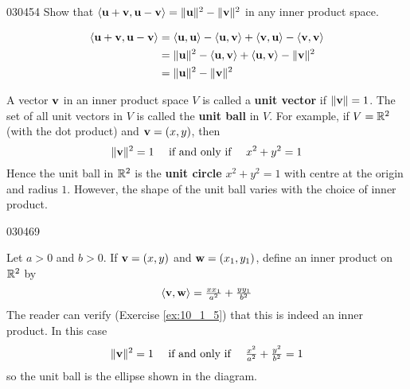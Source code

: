 \begin{example}{}{030454}
Show that $\langle\textbf{u} + \textbf{v}, \textbf{u} - \textbf{v}\rangle = \|\textbf{u}\|^{2} - \|\textbf{v}\|^{2}$ in any inner product space.

\begin{solution}
\vspace*{-2em}\begin{align*}
\langle \textbf{u} + \textbf{v}, \textbf{u} - \textbf{v} \rangle &= \langle \textbf{u}, \textbf{u} \rangle - \langle \textbf{u}, \textbf{v} \rangle + \langle \textbf{v}, \textbf{u} \rangle - \langle \textbf{v}, \textbf{v} \rangle \\
&= \| \textbf{u} \|^2 - \langle \textbf{u}, \textbf{v} \rangle + \langle \textbf{u}, \textbf{v} \rangle - \| \textbf{v} \|^2 \\
&= \| \textbf{u} \|^2 - \| \textbf{v} \|^2
\end{align*}
\end{solution}
\end{example}

A vector $\textbf{v}$ in an inner product space $V$ is called a \textbf{unit vector} if $\|\textbf{v}\| = 1$. The set of all unit vectors in $V$ is called the \textbf{unit ball} in $V$. For example, if $V = \mathbb{R}^2$ (with the dot product) and $\textbf{v} = (x, y)$, then
\begin{equation*}
\| \textbf{v} \|^2 = 1 \quad \mbox{ if and only if } \quad x^2 + y^2 = 1
\end{equation*}
Hence the unit ball in $\mathbb{R}^2$ is the \textbf{unit circle} $x^{2} + y^{2} = 1$ with centre at the origin and radius $1$. However, the shape of the unit ball varies with the choice of inner product.

\begin{example}{}{030469}
\begin{wrapfigure}[11]{l}{5cm} 
\centering

\end{wrapfigure}

\setlength{\rightskip}{0pt plus 200pt}
Let $a > 0$ and $b > 0$. If $\textbf{v} = (x, y)$ and $\textbf{w} = (x_{1}, y_{1})$, define an inner product on $\mathbb{R}^2$ by
\begin{equation*}
\langle \textbf{v}, \textbf{w} \rangle = \tfrac{xx_1}{a^2} + \tfrac{yy_1}{b^2}
\end{equation*}
The reader can verify (Exercise \ref{ex:10_1_5}) that this is indeed an inner product. In this case
\begin{equation*}
\| \textbf{v} \|^2 = 1 \quad \mbox{ if and only if } \quad \tfrac{x^2}{a^2} + \tfrac{y^2}{b^2} = 1
\end{equation*}
so the unit ball is the ellipse shown in the diagram.
\end{example}


